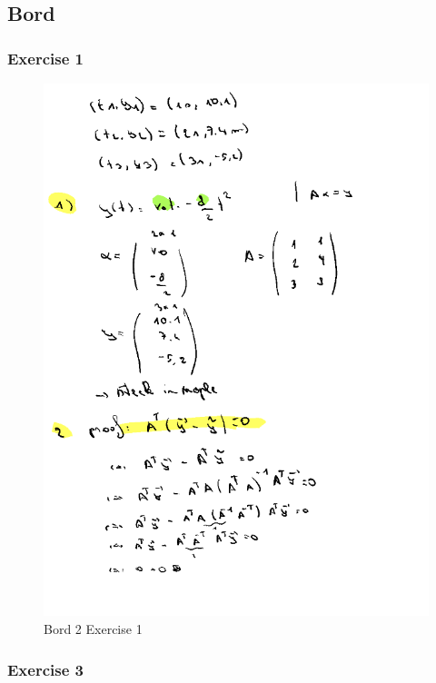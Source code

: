 \documentclass[a4paper]{report}
\begin{document}
\subsection{Bord}

\subsubsection{Exercise 1}

\begin{figure}[H]
	\centering
	\includegraphics[width=\textwidth]{assets/bordles_2_ex_1.png}
	\caption{Bord 2 Exercise 1}
	\label{fig:bord_2_ex_1}
\end{figure}



\subsubsection{Exercise 3}
\end{document}

